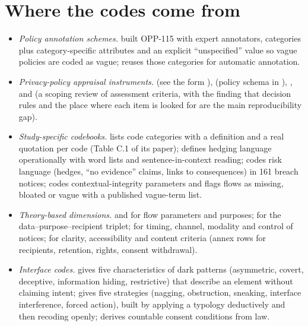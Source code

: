 \section{Where the codes come from}
\begin{itemize}
\item \emph{Policy annotation schemes.}  built OPP-115 with expert annotators, categories plus category-specific attributes and an explicit ``unspecified'' value so vague policies are coded as vague;  reuses those categories for automatic annotation.
\item \emph{Privacy-policy appraisal instruments.}  (see the form ),  (policy schema in ), ,  and  (a scoping review of assessment criteria, with the finding that decision rules and the place where each item is looked for are the main reproducibility gap).
\item \emph{Study-specific codebooks.}  lists code categories with a definition and a real quotation per code (Table C.1 of its paper);  defines hedging language operationally with word lists and sentence-in-context reading;  codes risk language (hedges, ``no evidence'' claims, links to consequences) in 161 breach notices;  codes contextual-integrity parameters and flags flows as missing, bloated or vague with a published vague-term list.
\item \emph{Theory-based dimensions.}  and  for flow parameters and purposes;  for the data--purpose--recipient triplet;  for timing, channel, modality and control of notices;  for clarity, accessibility and content criteria (annex rows for recipients, retention, rights, consent withdrawal).
\item \emph{Interface codes.}  gives five characteristics of dark patterns (asymmetric, covert, deceptive, information hiding, restrictive) that describe an element without claiming intent;  gives five strategies (nagging, obstruction, sneaking, interface interference, forced action), built by applying a typology deductively and then recoding openly;  derives countable consent conditions from law.
\end{itemize}

